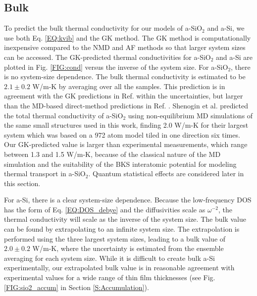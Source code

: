 \documentclass[aps,prb,onecolumn,preprint,superscriptaddress,footinbib,amsmath,amssymb,floatfix]{revtex4}
\begin{document}
\subsection{\label{S:Bulk}Bulk}

To predict the bulk thermal conductivity for our models of a-SiO$_2$ and 
a-Si, we use both Eq. \eqref{EQ:kvib} 
and the GK method. The GK method is computationally 
inexpensive compared to the NMD and AF methods so that 
larger system sizes can be accessed.  
The GK-predicted thermal conductivities for a-SiO$_2$ and a-Si 
are plotted in Fig. \ref{FIG:cond} versus the inverse of the system 
size. For a-SiO$_2$, there is no system-size dependence.  
The bulk thermal conductivity is estimated to be 
$2.1 \pm 0.2$ W/m-K by averaging over all the samples. This prediction 
is in agreement with the GK predictions in Ref. 
 within the uncertainties, 
but larger than the MD-based direct-method predictions in Ref. 
. 
Shenogin et al. predicted the total thermal 
conductivity of a-SiO$_2$ using 
non-equilibrium MD simulations of the same small structures 
used in this work, finding 2.0 W/m-K for their 
largest system which was based on a 972 atom model 
tiled in one direction six times.\cite{shenogin_predicting_2009}
Our GK-predicted value is larger than experimental 
measurements, which range between 
1.3 and 1.5 W/m-K,
\cite{cahill_lattice_1988,lee_heat_1997,
yamane_measurement_2002,regner_broadband_2013} 
because of the classical nature of the MD simulation 
and the suitability of the BKS interatomic potential 
for modeling thermal transport in a-SiO$_2$.
\cite{jund_molecular-dynamics_1999,mcgaughey_thermal_2004}
Quantum statistical effects are considered later in this section. 

For a-Si, there is a clear system-size dependence. 
Because the low-frequency DOS has the form of Eq. \eqref{EQ:DOS_debye} 
and the diffusivities scale as $\omega^{-2}$,  
the thermal conductivity will scale as the inverse of the system size. 
The bulk value can be found by extrapolating to an infinite system size.
\cite{shiomi_thermal_2011,esfarjani_heat_2011,larkin_comparison_2012} 
The extrapolation is performed using the three largest 
system sizes,\cite{mfp_fn2} leading to a bulk value 
of $2.0 \pm 0.2$ W/m-K, where the uncertainty is 
estimated from the ensemble averaging for each system size. 
While it is difficult to create 
bulk a-Si experimentally,\cite{vacher_attenuation_1980} 
our extrapolated bulk value 
is in reasonable agreement with experimental values for a wide 
range of thin film thicknesses (see Fig. \ref{FIG:sio2_accum} in 
Section \ref{S:Accumulation}). 
\end{document}
